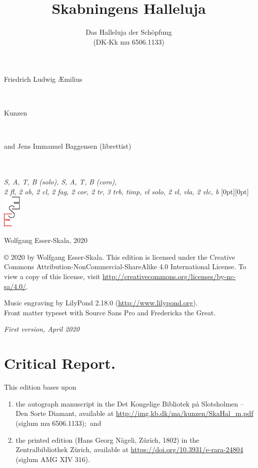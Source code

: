 \documentclass[parskip=full]{scrreprt}
\makeatletter
\DeclareRobustCommand{\sbseries}{\fontseries{sb}\selectfont}
\newcommand\fancytitlehead{
	\headingfont%
	\fontsize{80}{80}\selectfont\textcolor{black!80}{\@lastname.}\\[15pt]%
	\fontsize{60}{60}\selectfont\@ifundefined{@shorttitle}{\@title}{\@shorttitle}.%
}
\def\firstname#1{\def\@firstname{#1}}
\def\lastname#1{\def\@lastname{#1}}
\def\shorttitle#1{\def\@shorttitle{#1}}
\def\namesuffix#1{\def\@namesuffix{#1}}
\def\instrumentation#1{\def\@instrumentation{#1}}
\def\maketitle{%
\begin{titlepage}%
	\Large%
	{\@titlehead}%
	\vfill%
	{\strut\@firstname}\\%
	{\sbseries\color{oldred}\strut\@lastname}\\%
	{\strut\@namesuffix}%
	\vfill%
	{\sbseries\@title}\\%
	{\@subtitle}\\[\baselineskip]%
	{\itshape\@instrumentation}%
	\vfill%
	{\itshape\@parts}\hspace*{\fill}\raisebox{0pt}[0pt][0pt]{\includegraphics{ees_logo}}%
\end{titlepage}%
}
\newif\ifprintreport\printreportfalse
\makeatother
\begin{document}
\titlehead{\fancytitlehead}
\firstname{Friedrich Ludwig Æmilius}
\lastname{Kunzen}
\namesuffix{and Jens Immanuel Baggensen (librettist)}
\title{Skabningens Halleluja}
\shorttitle{Skabningens\\Halleluja}
\subtitle{Das Halleluja der Schöpfung\\(DK-Kk mu 6506.1133)}
\instrumentation{S, A, T, B (solo), S, A, T, B (coro),\\
2 fl, 2 ob, 2 cl, 2 fag, 2 cor, 2 tr, 3 trb, timp, vl solo, 2 vl, vla, 2 vlc, b}
\maketitle


\thispagestyle{empty}

\vspace*{\fill}

\hspace*{1em}Wolfgang Esser-Skala, 2020

© 2020 by Wolfgang Esser-Skala. This edition is licensed under the Creative Commons Attribution-NonCommercial-ShareAlike 4.0 International License. To view a copy of this license, visit \url{http://creativecommons.org/licenses/by-nc-sa/4.0/}. 

Music engraving by LilyPond 2.18.0 (\url{http://www.lilypond.org}).\\
Front matter typeset with Source Sans Pro and Fredericka the Great.

\textit{First version, April 2020}

\vspace*{2cm}

\ifprintreport
\chapter*{Critical Report.}

This edition bases upon
\begin{enumerate}
	\item the autograph manuscript in the Det Kongelige Bibliotek på Slotsholmen – Den Sorte Diamant, available at \url{http://img.kb.dk/ma/kunzen/SkaHal_m.pdf} (siglum mu 6506.1133);~and
	\item the printed edition (Hans Georg Nägeli, Zürich, 1802) in the Zentralbibliothek Zürich, available at \url{https://doi.org/10.3931/e-rara-24804} (siglum AMG XIV 316).
\end{enumerate}
\end{document}
